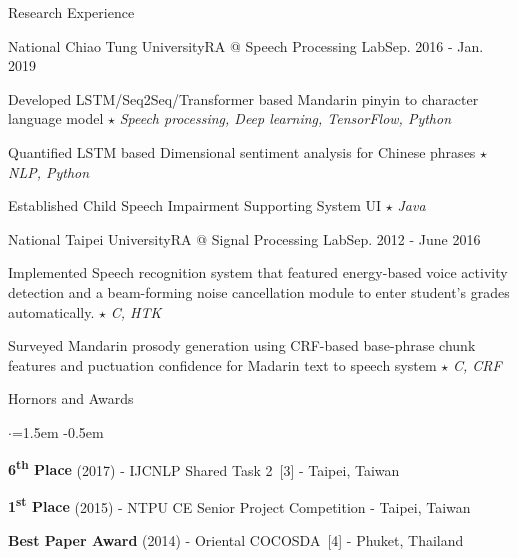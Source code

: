 \documentclass{resume_short} %
\newcommand{\ts}{\textsuperscript}
\begin{document}
\begin{rSection}{Research Experience}
    \begin{rSubsection3}{National Chiao Tung University}{RA @ Speech Processing Lab}{Sep. 2016 - Jan. 2019}
        \item Developed LSTM/Seq2Seq/Transformer based Mandarin pinyin to character language model \quad$\star$ {\em Speech processing, Deep learning, TensorFlow, Python}
        \item Quantified LSTM based Dimensional sentiment analysis for Chinese phrases \quad $\star$ {\em NLP, Python}
        \item Established Child Speech Impairment Supporting System UI \quad $\star$ {\em Java}
    \end{rSubsection3}
    \begin{rSubsection3}{National Taipei University}{RA @ Signal Processing Lab}{Sep. 2012 - June 2016}
        \item Implemented Speech recognition system that featured energy-based voice activity detection and a beam-forming noise cancellation module to enter student’s grades automatically. \quad$\star$ {\em C, HTK}
        \item Surveyed Mandarin prosody generation using CRF-based base-phrase chunk features and puctuation confidence for Madarin text to speech system \quad$\star$ {\em C, CRF}
    \end{rSubsection3}
\end{rSection}


\begin{rSection}{Hornors and Awards}
    \begin{list}{$\cdot$}{\leftmargin=1.5em}
        \itemsep -0.5em \vspace{-0.25em} %
        \item {\bf 6\ts{th} Place} (2017) - IJCNLP Shared Task 2~[3] - Taipei, Taiwan
        \item {\bf 1\ts{st} Place} (2015) - NTPU CE Senior Project Competition - Taipei, Taiwan
        \item {\bf Best Paper Award} (2014) - Oriental COCOSDA~[4] - Phuket, Thailand
    \end{list}
\end{rSection}
\end{document}
